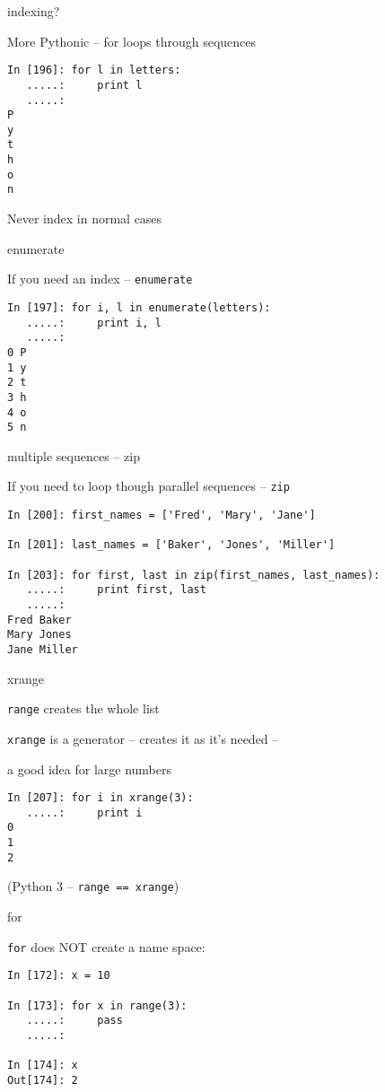 \documentclass{beamer}
\begin{document}
\begin{frame}[fragile]{indexing?}

{\Large More Pythonic -- for loops through sequences}
\begin{verbatim}
In [196]: for l in letters:
   .....:     print l
   .....:     
P
y
t
h
o
n
\end{verbatim}
\vfill
{\large Never index in normal cases}
\end{frame}

\begin{frame}[fragile]{enumerate}

{\Large If you need an index -- \verb|enumerate|}
\begin{verbatim}
In [197]: for i, l in enumerate(letters):
   .....:     print i, l
   .....:     
0 P
1 y
2 t
3 h
4 o
5 n
\end{verbatim}
\end{frame}

\begin{frame}[fragile]{multiple sequences -- zip}

{\Large If you need to loop though parallel sequences -- \verb|zip|}
\begin{verbatim}
In [200]: first_names = ['Fred', 'Mary', 'Jane']

In [201]: last_names = ['Baker', 'Jones', 'Miller']

In [203]: for first, last in zip(first_names, last_names):
   .....:     print first, last
   .....:     
Fred Baker
Mary Jones
Jane Miller
\end{verbatim}
\end{frame}

\begin{frame}[fragile]{xrange}

{\Large \verb|range| creates the whole list}

\vfill
{\Large \verb|xrange| is a generator -- creates it as it's needed --}

\vfill
{\Large a good idea for large numbers}

\begin{verbatim}
In [207]: for i in xrange(3):
   .....:     print i
0
1
2
\end{verbatim}
(Python 3 -- \verb|range == xrange|)
\end{frame}



\begin{frame}[fragile]{for}

{\Large \verb|for| does NOT create a name space:}

\begin{verbatim}
In [172]: x = 10

In [173]: for x in range(3):
   .....:     pass
   .....: 

In [174]: x
Out[174]: 2
\end{verbatim}
\end{frame}
\end{document}
